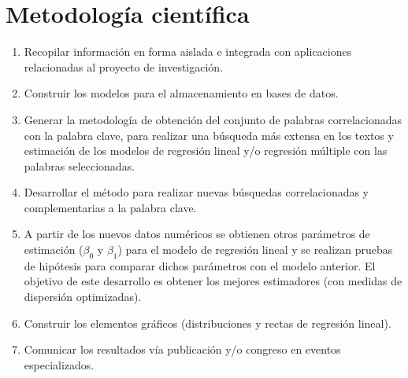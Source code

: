 \section {Metodología científica}
\begin{enumerate}
\item Recopilar información en forma aislada e integrada con aplicaciones relacionadas al proyecto de investigación.
\item Construir los modelos para el almacenamiento en bases de datos.
\item Generar la metodología de obtención del conjunto de palabras correlacionadas con la palabra clave, para realizar una búsqueda más extensa en los textos y estimación de los modelos de regresión lineal y/o regresión múltiple con las palabras seleccionadas.
\item Desarrollar el método para realizar nuevas búsquedas correlacionadas y complementarias a la palabra clave.
\item A partir de los nuevos datos numéricos se obtienen otros parámetros de estimación ($\beta_0$ y $\beta_1$) para el modelo de regresión lineal y se realizan pruebas de hipótesis para comparar dichos parámetros con el modelo anterior. El objetivo de este desarrollo es obtener los mejores estimadores (con medidas de dispersión optimizadas).
\item Construir los elementos gráficos (distribuciones y rectas de regresión lineal).
\item Comunicar los resultados vía publicación y/o congreso en eventos especializados.
\end{enumerate}